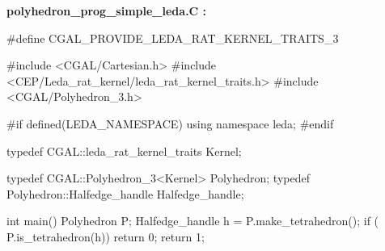 {\bf polyhedron\_prog\_simple\_leda.C :}

\begin{ccExampleCode}
#define CGAL_PROVIDE_LEDA_RAT_KERNEL_TRAITS_3

#include <CGAL/Cartesian.h>
#include <CEP/Leda_rat_kernel/leda_rat_kernel_traits.h>
#include <CGAL/Polyhedron_3.h>

#if defined(LEDA_NAMESPACE)
using namespace leda;
#endif

typedef CGAL::leda_rat_kernel_traits       Kernel;

typedef CGAL::Polyhedron_3<Kernel>         Polyhedron;
typedef Polyhedron::Halfedge_handle        Halfedge_handle;

int main() {
    Polyhedron P;
    Halfedge_handle h = P.make_tetrahedron();
    if ( P.is_tetrahedron(h))
        return 0;
    return 1;
}
\end{ccExampleCode}

\ccHtmlLinksOn
